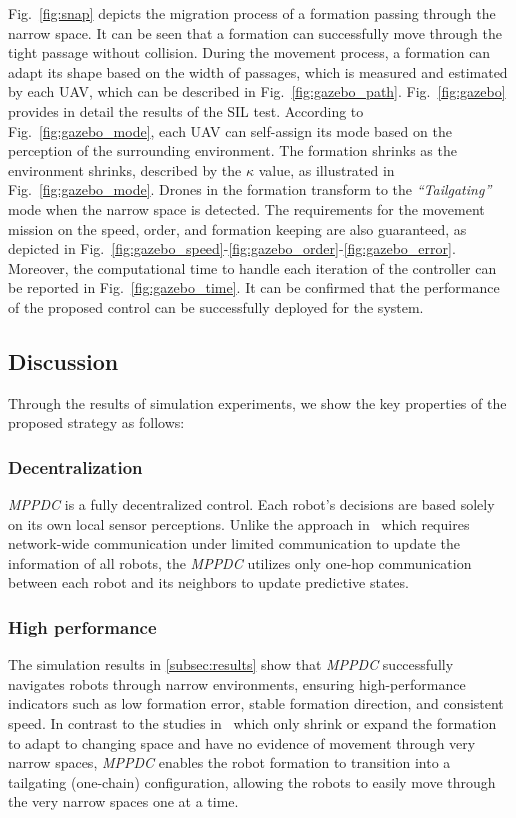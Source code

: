Fig.~\ref{fig:snap} depicts the migration process of a formation passing through the narrow space. It can be seen that a formation can successfully move through the tight passage without collision. During the movement process, a formation can adapt its shape based on the width of passages, which is measured and estimated by each UAV, which can be described in Fig.~\ref{fig:gazebo_path}. Fig.~\ref{fig:gazebo} provides in detail the results of the SIL test. According to Fig.~\ref{fig:gazebo_mode}, each UAV can self-assign its mode based on the perception of the surrounding environment. The formation shrinks as the environment shrinks, described by the $\kappa$ value, as illustrated in Fig.~\ref{fig:gazebo_mode}. Drones in the formation transform to the \textit{``Tailgating''} mode when the narrow space is detected. The requirements for the movement mission on the speed, order, and formation keeping are also guaranteed, as depicted in Fig.~\ref{fig:gazebo_speed}-\ref{fig:gazebo_order}-\ref{fig:gazebo_error}. Moreover, the computational time to handle each iteration of the controller can be reported in Fig.~\ref{fig:gazebo_time}. It can be confirmed that the performance of the proposed control can be successfully deployed for the system.

\subsection{Discussion}
Through the results of simulation experiments, we show the  key properties of the proposed strategy as follows:

\subsubsection{Decentralization} \textit{MPPDC} is a fully decentralized control. Each robot's decisions are based solely on its own local sensor perceptions. Unlike the approach in~\cite{AlonsoMora2018} which requires network-wide communication under limited communication to update the information of all robots, the \textit{MPPDC} utilizes only one-hop communication between each robot and its neighbors to update predictive states.

\subsubsection{High performance}

The simulation results in \ref{subsec:results} show that \textit{MPPDC} successfully navigates robots through narrow environments, ensuring high-performance indicators such as low formation error, stable formation direction, and consistent speed. In contrast to the studies in~\cite{Elkilany2020,Vsrhelyi2018,Soria2021,AlonsoMora2018} which only shrink or expand the formation to adapt to changing space and have no evidence of movement through very narrow spaces, \textit{MPPDC} enables the robot formation to transition into a tailgating (one-chain) configuration, allowing the robots to easily move through the very narrow spaces one at a time.

